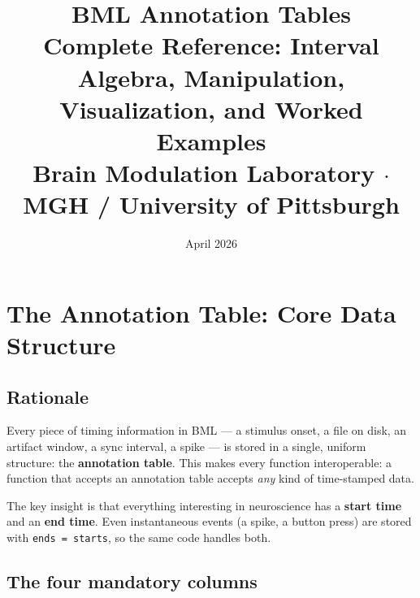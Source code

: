 \documentclass[11pt, a4paper]{article}
\title{\textbf{BML Annotation Tables}\\[0.5em]
  {\large Complete Reference: Interval Algebra, Manipulation,}\\
  {\large Visualization, and Worked Examples}\\[0.6em]
  {\normalsize Brain Modulation Laboratory $\cdot$ MGH / University of Pittsburgh}}
\author{}
\date{April 2026}
\begin{document}
\maketitle
\tableofcontents
\newpage

\section{The Annotation Table: Core Data Structure}
\label{sec:schema}

\subsection{Rationale}

Every piece of timing information in BML --- a stimulus onset, a file on disk, an artifact window, a sync interval, a spike --- is stored in a single, uniform structure: the \textbf{annotation table}. This makes every function interoperable: a function that accepts an annotation table accepts \emph{any} kind of time-stamped data.

The key insight is that everything interesting in neuroscience has a \textbf{start time} and an \textbf{end time}. Even instantaneous events (a spike, a button press) are stored with \texttt{ends = starts}, so the same code handles both.

\subsection{The four mandatory columns}
\end{document}
